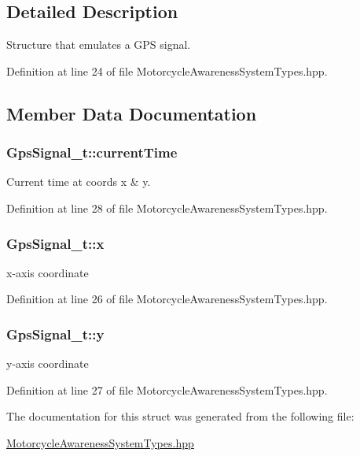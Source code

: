 \subsection{Detailed Description}
Structure that emulates a G\-P\-S signal. 

Definition at line 24 of file Motorcycle\-Awareness\-System\-Types.\-hpp.



\subsection{Member Data Documentation}
\hypertarget{structGpsSignal__t_abc96245129f39c6e51e8bfe955f2047e}{
\subsubsection[{current\-Time}]{ Gps\-Signal\-\_\-t\-::current\-Time}}\label{structGpsSignal__t_abc96245129f39c6e51e8bfe955f2047e}


Current time at coords x \& y. 



Definition at line 28 of file Motorcycle\-Awareness\-System\-Types.\-hpp.

\hypertarget{structGpsSignal__t_a6f7bd3c500b55923ab335ada4b6b26eb}{
\subsubsection[{x}]{ Gps\-Signal\-\_\-t\-::x}}\label{structGpsSignal__t_a6f7bd3c500b55923ab335ada4b6b26eb}


x-\/axis coordinate 



Definition at line 26 of file Motorcycle\-Awareness\-System\-Types.\-hpp.

\hypertarget{structGpsSignal__t_ab9e083be189fc842ed7aa4fdc978e94e}{
\subsubsection[{y}]{ Gps\-Signal\-\_\-t\-::y}}\label{structGpsSignal__t_ab9e083be189fc842ed7aa4fdc978e94e}


y-\/axis coordinate 



Definition at line 27 of file Motorcycle\-Awareness\-System\-Types.\-hpp.



The documentation for this struct was generated from the following file\-:\begin{DoxyCompactItemize}
\item 
\hyperlink{MotorcycleAwarenessSystemTypes_8hpp}{Motorcycle\-Awareness\-System\-Types.\-hpp}\end{DoxyCompactItemize}
